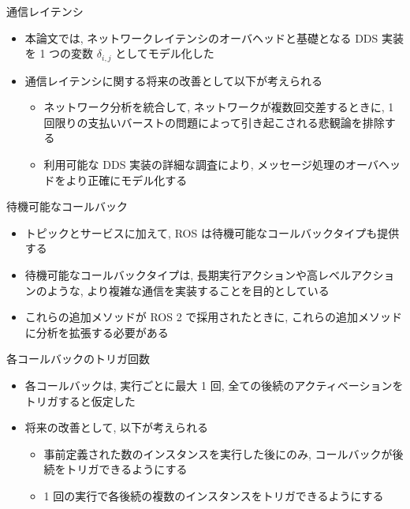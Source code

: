 \begin{frame}{通信レイテンシ}
    \begin{itemize}
        \item 本論文では, ネットワークレイテンシのオーバヘッドと基礎となる DDS 実装を 1 つの変数 $\delta_{i, j}$ としてモデル化した
        \item 通信レイテンシに関する将来の改善として以下が考えられる
              \begin{itemize}
                  \item ネットワーク分析を統合して, ネットワークが複数回交差するときに, 1 回限りの支払いバーストの問題によって引き起こされる悲観論を排除する
                  \item 利用可能な DDS 実装の詳細な調査により, メッセージ処理のオーバヘッドをより正確にモデル化する
              \end{itemize}
    \end{itemize}
\end{frame}

\begin{frame}{待機可能なコールバック}
    \begin{itemize}
        \item トピックとサービスに加えて, ROS は待機可能なコールバックタイプも提供する
        \item 待機可能なコールバックタイプは, 長期実行アクションや高レベルアクションのような, より複雑な通信を実装することを目的としている
        \item これらの追加メソッドが ROS 2 で採用されたときに, これらの追加メソッドに分析を拡張する必要がある
    \end{itemize}
\end{frame}

\begin{frame}{各コールバックのトリガ回数}
    \begin{itemize}
        \item 各コールバックは, 実行ごとに最大 1 回, 全ての後続のアクティベーションをトリガすると仮定した
        \item 将来の改善として, 以下が考えられる
              \begin{itemize}
                  \item  事前定義された数のインスタンスを実行した後にのみ, コールバックが後続をトリガできるようにする
                  \item 1 回の実行で各後続の複数のインスタンスをトリガできるようにする
              \end{itemize}
    \end{itemize}
\end{frame}

